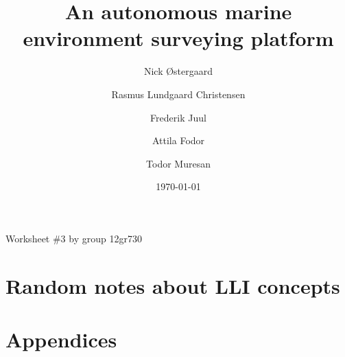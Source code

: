 
\usepackage{bytefield}



\frontmatter
\author{Nick Østergaard \and Rasmus Lundgaard Christensen \and Frederik Juul \and Attila Fodor \and Todor Muresan}
\title{An autonomous marine environment surveying platform}
\date{\today}
\maketitle
\begin{center}
Worksheet \#3 by group 12gr730
\end{center}



\cleardoublepage
%
%
%

\cleardoublepage
\tableofcontents


\mainmatter









\chapter{Random notes about LLI concepts}





\backmatter
\chapter{Appendices}

\label{appendices:bow thruster schematic}

\label{ch:litt}




